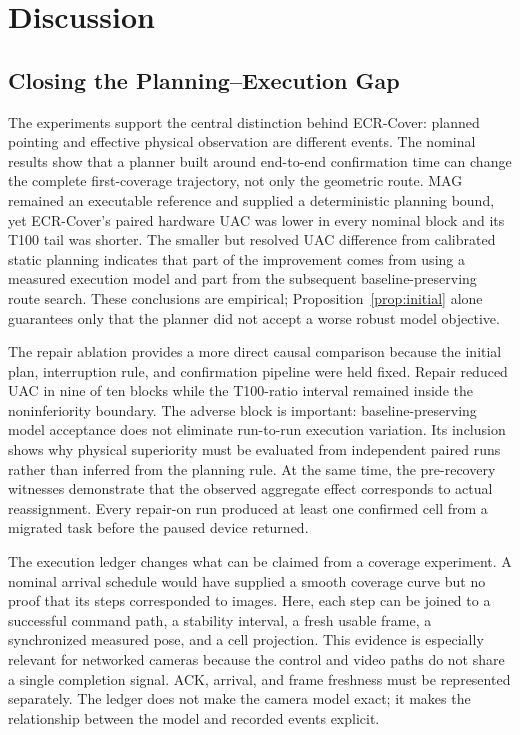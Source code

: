 \section{Discussion}\label{sec:discussion}

\subsection{Closing the Planning--Execution Gap}

The experiments support the central distinction behind ECR-Cover: planned pointing and effective physical observation are different events. The nominal results show that a planner built around end-to-end confirmation time can change the complete first-coverage trajectory, not only the geometric route. MAG remained an executable reference and supplied a deterministic planning bound, yet ECR-Cover's paired hardware UAC was lower in every nominal block and its T100 tail was shorter. The smaller but resolved UAC difference from calibrated static planning indicates that part of the improvement comes from using a measured execution model and part from the subsequent baseline-preserving route search. These conclusions are empirical; Proposition~\ref{prop:initial} alone guarantees only that the planner did not accept a worse robust model objective.

The repair ablation provides a more direct causal comparison because the initial plan, interruption rule, and confirmation pipeline were held fixed. Repair reduced UAC in nine of ten blocks while the T100-ratio interval remained inside the noninferiority boundary. The adverse block is important: baseline-preserving model acceptance does not eliminate run-to-run execution variation. Its inclusion shows why physical superiority must be evaluated from independent paired runs rather than inferred from the planning rule. At the same time, the pre-recovery witnesses demonstrate that the observed aggregate effect corresponds to actual reassignment. Every repair-on run produced at least one confirmed cell from a migrated task before the paused device returned.

The execution ledger changes what can be claimed from a coverage experiment. A nominal arrival schedule would have supplied a smooth coverage curve but no proof that its steps corresponded to images. Here, each step can be joined to a successful command path, a stability interval, a fresh usable frame, a synchronized measured pose, and a cell projection. This evidence is especially relevant for networked cameras because the control and video paths do not share a single completion signal. ACK, arrival, and frame freshness must be represented separately. The ledger does not make the camera model exact; it makes the relationship between the model and recorded events explicit.


